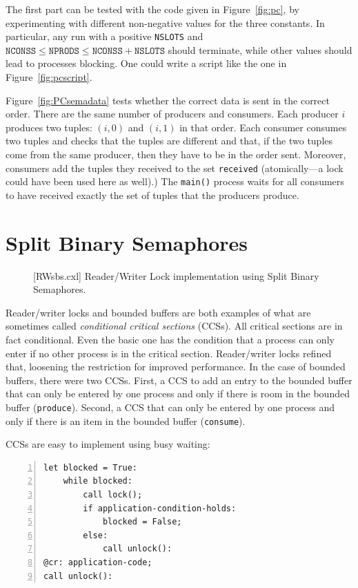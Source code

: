 \documentclass{report}
\newenvironment{code}{
\tcolorbox
}{
\endtcolorbox
}
\begin{document}
The first part can be tested with the code given in Figure~\ref{fig:pc}, by
experimenting with different non-negative values for the three constants.
In particular, any run with a positive \texttt{NSLOTS} and
$\mathtt{NCONSS} \le \mathtt{NPRODS} \le \mathtt{NCONSS} + \mathtt{NSLOTS}$
should terminate, while other values should lead to processes blocking.
One could write a script like the one in Figure~\ref{fig:pcscript}.

Figure~\ref{fig:PCsemadata} tests whether the correct data is sent in
the correct order.  There are the same number of producers and consumers.
Each producer $i$ produces two tuples: $(i, 0)$ and $(i, 1)$ in that order.
Each consumer consumes two tuples and checks that the tuples are different
and that, if the two tuples come from the same producer, then they have to
be in the order sent.
Moreover, consumers add the tuples they received to the set
\texttt{received} (atomically---a lock could have been used here as well).)
The \texttt{main()} process waits for all consumers to have received
exactly the set of tuples that the producers produce.

\chapter{Split Binary Semaphores}

\begin{figure}
\begin{code}
\end{code}
\caption{[RWsbs.cxl] Reader/Writer Lock implementation using Split Binary Semaphores.}
\label{fig:RWsplitsema}
\end{figure}

Reader/writer locks and bounded buffers are both examples of what are
sometimes called \emph{conditional critical sections} (CCSs).
All critical sections are in fact conditional.  Even the basic one
has the condition that a process can only enter if no other process
is in the critical section.  Reader/writer locks refined that, loosening
the restriction for improved performance.
In the case of bounded buffers, there were two CCSs.  First, a CCS
to add an entry to the bounded buffer that can only be entered by one
process and only if there is room in the bounded buffer (\texttt{produce}).
Second, a CCS that can only be entered by one process and
only if there is an item in the bounded buffer (\texttt{consume}).

CCSs are easy to implement using busy waiting:
\begin{code}
\begin{Verbatim}[xleftmargin=5mm,numbers=left]
let blocked = True:
    while blocked:
        call lock();
        if application-condition-holds:
            blocked = False;
        else:
            call unlock():
@cr: application-code;
call unlock():
\end{Verbatim}
\end{code}
\end{document}
